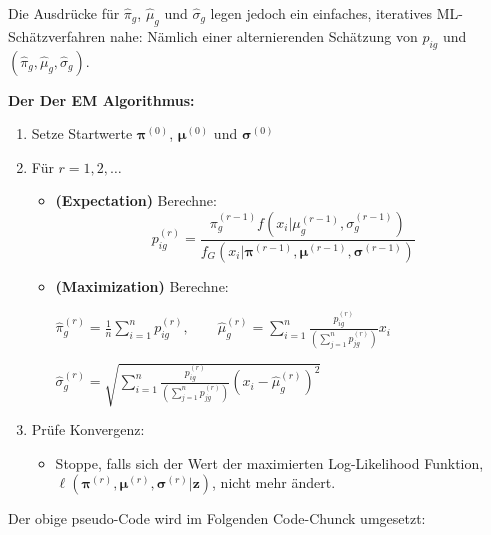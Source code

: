 \documentclass[
  ngerman,
]{book}
\providecommand{\tightlist}{%
  \setlength{\itemsep}{0pt}\setlength{\parskip}{0pt}}
\begin{document}
Die Ausdrücke für \(\hat\pi_g\), \(\hat\mu_g\) und \(\hat\sigma_g\) legen jedoch ein einfaches, iteratives ML-Schätzverfahren nahe: Nämlich einer alternierenden Schätzung von \(p_{ig}\) und \((\hat\pi_g, \hat\mu_g,\hat\sigma_g)\).

\textbf{Der Der EM Algorithmus:}

\begin{enumerate}
\def\labelenumi{\arabic{enumi}.}
\item
  Setze Startwerte \(\boldsymbol{\pi}^{(0)}\), \(\boldsymbol{\mu}^{(0)}\) und \(\boldsymbol{\sigma}^{(0)}\)
\item
  Für \(r=1,2,\dots\)

  \begin{itemize}
  \item
    {\textbf{(Expectation)}} Berechne:
    \[p_{ig}^{(r)}=\frac{\pi_g^{(r-1)}f(x_i|\mu^{(r-1)}_g,\sigma_g^{(r-1)})}{f_G(x_i|\boldsymbol{\pi}^{(r-1)},\boldsymbol{\mu}^{(r-1)},\boldsymbol{\sigma}^{(r-1)})}\]
  \item
    {\textbf{(Maximization)}} Berechne:

    \(\hat\pi_g^{(r)}=\frac{1}{n}\sum_{i=1}^np_{ig}^{(r)},\quad\quad\hat\mu_g^{(r)}=\sum_{i=1}^n\frac{p_{ig}^{(r)}}{\left(\sum_{j=1}^np_{jg}^{(r)}\right)}x_i\)

    \(\hat\sigma_g^{(r)}=\sqrt{\sum_{i=1}^n\frac{p_{ig}^{(r)}}{\left(\sum_{j=1}^np_{jg}^{(r)}\right)}\left(x_i-\hat\mu_g^{(r)}\right)^2}\)
  \end{itemize}
\item
  Prüfe Konvergenz:

  \begin{itemize}
  \tightlist
  \item
    Stoppe, falls sich der Wert der maximierten Log-Likelihood Funktion, \(\ell(\boldsymbol{\pi}^{(r)},\boldsymbol{\mu}^{(r)},\boldsymbol{\sigma}^{(r)}|\mathbf{z})\), nicht mehr ändert.
  \end{itemize}
\end{enumerate}

Der obige pseudo-Code wird im Folgenden Code-Chunck umgesetzt:
\end{document}
